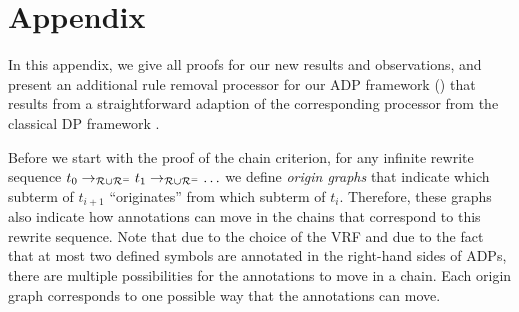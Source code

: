 \section{Appendix}\label{Appendix}
In this appendix, we give all proofs for our new results and observations, and present an
additional rule removal processor for our ADP framework () that results
from a straightforward adaption of the corresponding processor from the classical DP
framework \cite{gieslLPAR04dpframework}.

Before we start with the proof of the chain criterion,
for any infinite rewrite sequence $t_0 \to_{\mathcal{R}\cup \mathcal{R}^{=}} t_1 \to_{\mathcal{R}\cup \mathcal{R}^{=}} \ldots$
we define \emph{origin graphs} 
that indicate
which subterm of $t_{i+1}$ ``originates'' from which subterm of $t_i$. Therefore, these
graphs also indicate how annotations can move in the chains that correspond to this
rewrite sequence.
Note that due to the choice of the VRF and due to the fact that at most two defined symbols
are annotated in the right-hand sides of ADPs,
there are multiple possibilities 
for the annotations to move in a chain.
Each origin graph corresponds to one possible way that the annotations can move.

